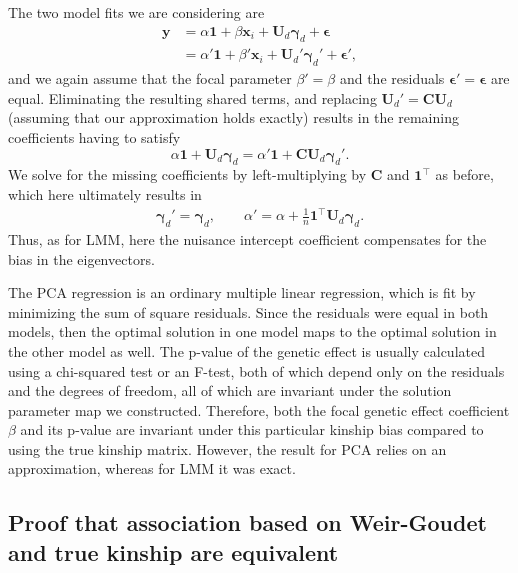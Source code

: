 \documentclass[11pt]{article}
\begin{document}
The two model fits we are considering are
\begin{align*}
  \mathbf{y}
  &=
    \alpha \mathbf{1} + \beta \mathbf{x}_i + \mathbf{U}_d \boldsymbol{\gamma}_d + \boldsymbol{\epsilon}
  \\
  &=
    \alpha' \mathbf{1} + \beta' \mathbf{x}_i + \mathbf{U}_d' \boldsymbol{\gamma}_d' + \boldsymbol{\epsilon}'
    ,
\end{align*}
and we again assume that the focal parameter $\beta' = \beta$ and the residuals $\boldsymbol{\epsilon}' = \boldsymbol{\epsilon}$ are equal.
Eliminating the resulting shared terms, and replacing $\mathbf{U}_d' = \mathbf{C} \mathbf{U}_d$ (assuming that our approximation holds exactly) results in the remaining coefficients having to satisfy
$$
\alpha \mathbf{1} + \mathbf{U}_d \boldsymbol{\gamma}_d
=
\alpha' \mathbf{1} + \mathbf{C} \mathbf{U}_d \boldsymbol{\gamma}_d'.
$$
We solve for the missing coefficients by left-multiplying by $\mathbf{C}$ and $\mathbf{1}^\intercal$ as before, which here ultimately results in
\begin{align*}
  \boldsymbol{\gamma}_d'
  =
    \boldsymbol{\gamma}_d
  ,
  \quad\quad
  \alpha'
  =
    \alpha + \frac{1}{n} \mathbf{1}^\intercal \mathbf{U}_d \boldsymbol{\gamma}_d
    .
\end{align*}
Thus, as for LMM, here the nuisance intercept coefficient compensates for the bias in the eigenvectors.

The PCA regression is an ordinary multiple linear regression, which is fit by minimizing the sum of square residuals.
Since the residuals were equal in both models, then the optimal solution in one model maps to the optimal solution in the other model as well.
The p-value of the genetic effect is usually calculated using a chi-squared test or an F-test, both of which depend only on the residuals and the degrees of freedom, all of which are invariant under the solution parameter map we constructed.
Therefore, both the focal genetic effect coefficient $\beta$ and its p-value are invariant under this particular kinship bias compared to using the true kinship matrix.
However, the result for PCA relies on an approximation, whereas for LMM it was exact.

\subsection{Proof that association based on Weir-Goudet and true kinship are equivalent}
\end{document}
